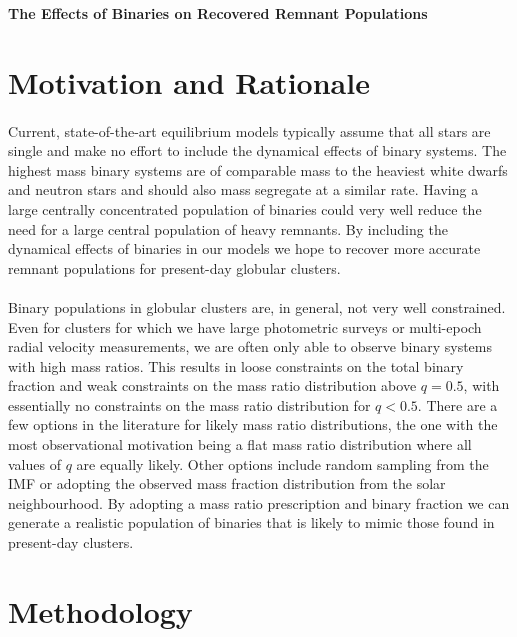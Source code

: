 \documentclass[12pt,letterpaper]{article}
\begin{document}
\begin{center}
	\Large{\textbf{The Effects of Binaries on Recovered Remnant Populations}}
\end{center}


\section{Motivation and Rationale}
\paragraph{}
Current, state-of-the-art equilibrium models typically assume that all stars are single and make no
effort to include the dynamical effects of binary systems. The highest mass binary systems are of
comparable mass to the heaviest white dwarfs and neutron stars and should also mass segregate at a
similar rate. Having a large centrally concentrated population of binaries could very well reduce
the need for a large central population of heavy remnants. By including the dynamical effects of
binaries in our models we hope to recover more accurate remnant populations for present-day globular
clusters.


\paragraph{}
Binary populations in globular clusters are, in general, not very well constrained. Even for
clusters for which we have large photometric surveys or multi-epoch radial velocity measurements, we
are often only able to observe binary systems with high mass ratios. This results in loose
constraints on the total binary fraction and weak constraints on the mass ratio distribution above
$q = 0.5$, with essentially no constraints on the mass ratio distribution for $q < 0.5$. There are a
few options in the literature for likely mass ratio distributions, the one with the most
observational motivation being a flat mass ratio distribution where all values of $q$ are equally
likely. Other options include random sampling from the IMF or adopting the observed mass fraction
distribution from the solar neighbourhood. By adopting a mass ratio prescription and binary fraction
we can generate a realistic population of binaries that is likely to mimic those found in
present-day clusters.



\section{Methodology}
\end{document}
